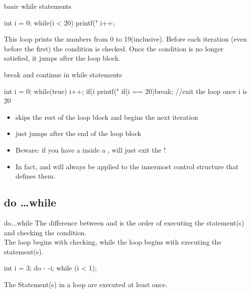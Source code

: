 \documentclass[10pt,graphics,aspectratio=169,table]{beamer}
\begin{document}
\begin{frame}[fragile]{basic while statements}
    \begin{codeblock}
int i = 0;
while(i < 20){
    printf("%
    i++;
}
    \end{codeblock}

    This loop prints the numbers from 0 to 19(inclusive).
    Before each iteration (even before the first) the condition is checked.
    Once the condition is no longer satisfied, it jumps after the loop block.
\end{frame}
\begin{frame}[fragile]{break and continue in while statements}
    \begin{codeblock}
int i = 0;
while(true){
    i++;
    if(i %
    printf("%
    if(i == 20)break; //exit the loop once i is 20
}
    \end{codeblock}
    \begin{itemize}
        \item
             skips the rest of the loop block and begins
            the next iteration
        \item {} just jumps after the end of the loop block
        \item
            Beware: if you have a  inside a ,
             will just exit the !
        \item
            In fact,  and  will always be applied to
            the innermost control structure that defines them.
    \end{itemize}
\end{frame}

\subsection{do \ldots while}

\begin{frame}[fragile]{do...while}
    The difference between  and  is the order of executing the statement(s) and checking the condition.\\
    \bigskip
    The  loop begins with checking, while the  loop begins with executing the statement(s).
    \begin{codeblock}
int i = 3;
do {
    - -i;
} while (i < 1);
\end{codeblock}
    \bigskip
    The Statement(s) in a  loop are executed at least once.
\end{frame}
\end{document}
